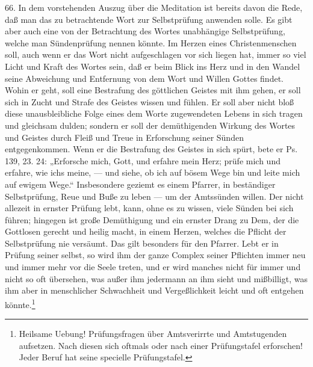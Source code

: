 66. In dem vorstehenden Auszug über die Meditation ist bereits davon die Rede, daß man das zu betrachtende Wort zur Selbstprüfung anwenden solle. Es gibt aber auch eine von der Betrachtung des Wortes unabhängige Selbstprüfung, welche man Sündenprüfung nennen könnte. Im Herzen eines Christenmenschen soll, auch wenn er das Wort nicht aufgeschlagen vor sich liegen hat, immer so viel Licht und Kraft des Wortes sein, daß er beim Blick ins Herz und in den Wandel seine Abweichung und Entfernung von dem Wort und Willen Gottes findet. Wohin er geht, soll eine Bestrafung des göttlichen Geistes mit ihm gehen, er soll sich in Zucht und Strafe des Geistes wissen und fühlen. Er soll aber nicht bloß diese unausbleibliche Folge eines dem Worte zugewendeten Lebens in sich tragen und gleichsam dulden; sondern er soll der demüthigenden Wirkung des Wortes und Geistes durch Fleiß und Treue in Erforschung seiner Sünden entgegenkommen. Wenn er die Bestrafung des Geistes in sich spürt, bete er Ps. 139, 23. 24: „Erforsche mich, Gott, und erfahre mein Herz; prüfe mich und erfahre, wie ichs
meine, — und siehe, ob ich auf bösem Wege bin und leite mich auf ewigem Wege.“ Insbesondere geziemt es einem Pfarrer, in beständiger Selbstprüfung, Reue und Buße zu leben — um der Amtssünden willen. Der nicht allezeit in ernster Prüfung lebt, kann, ohne es zu wissen, viele Sünden bei sich führen; hingegen ist große Demüthigung und ein ernster Drang zu Dem, der die Gottlosen gerecht und heilig macht, in einem Herzen, welches die Pflicht der Selbstprüfung nie versäumt. Das gilt besonders für den Pfarrer. Lebt er in Prüfung seiner selbst, so wird ihm der ganze Complex seiner Pflichten immer neu und immer mehr vor die Seele treten, und er wird manches nicht für immer und nicht so oft übersehen, was außer ihm jedermann an ihm sieht und mißbilligt, was ihm aber in menschlicher Schwachheit und Vergeßlichkeit leicht und oft entgehen könnte.\footnote{Heilsame Uebung! Prüfungsfragen über Amtsverirrte und Amtstugenden aufsetzen. Nach diesen sich oftmals oder nach einer Prüfungstafel erforschen! Jeder Beruf hat seine specielle Prüfungstafel.}

